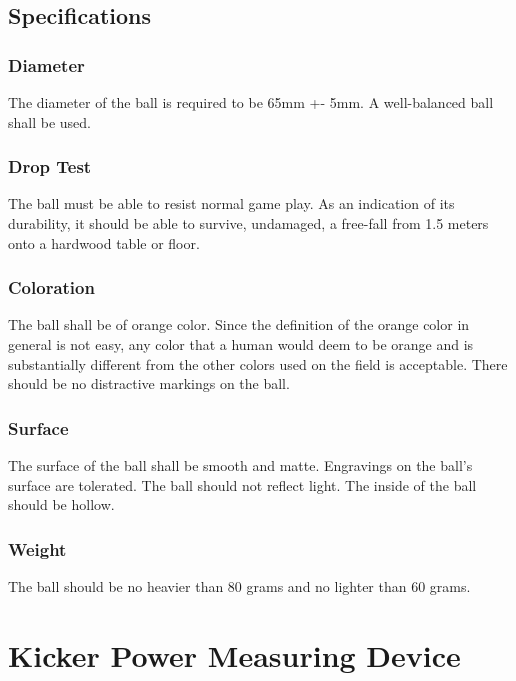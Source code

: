 \documentclass{article}
\begin{document}
\subsection{Specifications}

\subsubsection{Diameter}

The diameter of the ball is required to be 65mm +- 5mm. A well-balanced ball
shall be used.

\subsubsection{Drop Test}

The ball must be able to resist normal game play. As an indication of its
durability, it should be able to survive, undamaged, a free-fall from 1.5
meters onto a hardwood table or floor.

\subsubsection{Coloration}

The ball shall be of orange color. Since the definition of the orange color in
general is not easy, any color that a human would deem to be orange and is
substantially different from the other colors used on the field is acceptable.
There should be no distractive markings on the ball.

\subsubsection{Surface}

The surface of the ball shall be smooth and matte. Engravings on the ball's
surface are tolerated. The ball should not reflect light. The inside of the
ball should be hollow.

\subsubsection{Weight}

The ball should be no heavier than 80 grams and no lighter than 60 grams.

\section{Kicker Power Measuring Device\label{ref-064}}
\end{document}
